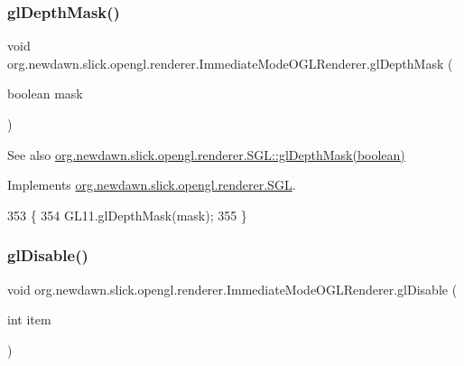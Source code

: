 \subsubsection{\texorpdfstring{gl\+Depth\+Mask()}{glDepthMask()}}
{\footnotesize\ttfamily void org.\+newdawn.\+slick.\+opengl.\+renderer.\+Immediate\+Mode\+O\+G\+L\+Renderer.\+gl\+Depth\+Mask (\begin{DoxyParamCaption}\item[{boolean}]{mask }\end{DoxyParamCaption})\hspace{0.3cm}{\ttfamily [inline]}}

\begin{DoxySeeAlso}{See also}
\mbox{\hyperlink{interfaceorg_1_1newdawn_1_1slick_1_1opengl_1_1renderer_1_1_s_g_l_a38dbc27d7cec53cf04ff1d98fd8c15e0}{org.\+newdawn.\+slick.\+opengl.\+renderer.\+S\+G\+L\+::gl\+Depth\+Mask(boolean)}} 
\end{DoxySeeAlso}


Implements \mbox{\hyperlink{interfaceorg_1_1newdawn_1_1slick_1_1opengl_1_1renderer_1_1_s_g_l_a38dbc27d7cec53cf04ff1d98fd8c15e0}{org.\+newdawn.\+slick.\+opengl.\+renderer.\+S\+GL}}.


\begin{DoxyCode}
353                                           \{
354         GL11.glDepthMask(mask);
355     \}
\end{DoxyCode}
\mbox{\label{classorg_1_1newdawn_1_1slick_1_1opengl_1_1renderer_1_1_immediate_mode_o_g_l_renderer_a98084664d41997626872ebedb5d76474}} 
\subsubsection{\texorpdfstring{gl\+Disable()}{glDisable()}}
{\footnotesize\ttfamily void org.\+newdawn.\+slick.\+opengl.\+renderer.\+Immediate\+Mode\+O\+G\+L\+Renderer.\+gl\+Disable (\begin{DoxyParamCaption}\item[{int}]{item }\end{DoxyParamCaption})\hspace{0.3cm}{\ttfamily [inline]}}

